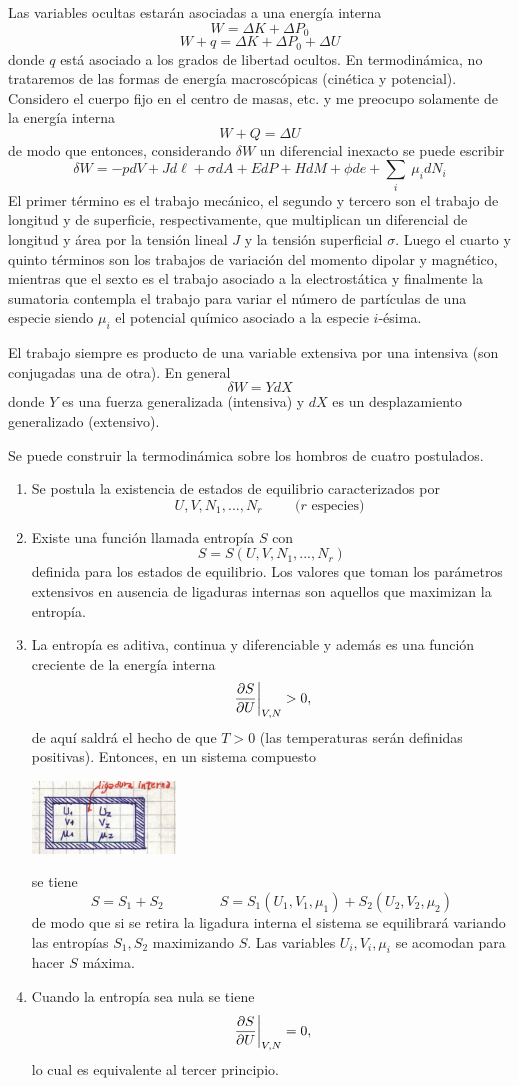 \documentclass[10pt,oneside]{CBFT_book}
\begin{document}
Las variables ocultas estarán asociadas a una energía interna
\[
	W = \Delta K + \Delta P_0
\]
\[
	W + q = \Delta K + \Delta P_0 + \Delta U
\]
donde $q$ está asociado a los grados de libertad ocultos. En termodinámica, no trataremos de las formas de 
energía macroscópicas (cinética y potencial). Considero el cuerpo fijo en el centro de masas, etc. y me
preocupo solamente de la energía interna
\[
	W + Q = \Delta U
\]
de modo que entonces, considerando $\delta W$ un diferencial inexacto se puede escribir
\[
	\delta W = - p dV + J d\ell + \sigma dA + E dP
	+ H dM + \phi de + \sum_{i} \: \mu_i dN_i
\]
El primer término es el trabajo mecánico, el segundo y tercero son el trabajo de longitud y de superficie,
respectivamente, que multiplican un diferencial de longitud y área por la tensión lineal $J$ y la tensión
superficial $\sigma$. Luego el cuarto y quinto términos son los trabajos de variación del momento dipolar
y magnético, mientras que el sexto es el trabajo asociado a la electrostática y finalmente la sumatoria
contempla el trabajo para variar el número de partículas de una especie siendo $\mu_i$ el potencial químico
asociado a la especie $i$-ésima.

El trabajo siempre es producto de una variable extensiva por una intensiva (son conjugadas una de otra).
En general
\[
	\delta W = Y dX
\]
donde $Y$ es una fuerza generalizada (intensiva) y $dX$ es un desplazamiento generalizado (extensivo).

Se puede construir la termodinámica sobre los hombros de cuatro postulados.
\begin{enumerate}
 \item Se postula la existencia de estados de equilibrio caracterizados por 
 \[
	U, V, N_1, ..., N_r \qquad \text{ ($r$ especies) }
 \]
 \item Existe una función llamada entropía $S$ con
 \[
	S = S(U, V, N_1, ..., N_r)
 \]
 definida para los estados de equilibrio. Los valores que toman los parámetros extensivos en
 ausencia de ligaduras internas son aquellos que maximizan la entropía.
 \item La entropía es aditiva, continua y diferenciable y además es una función creciente de la
 energía interna
 \[
	\left.\frac{\partial^{\hspace{-0.05em}} {S}}{\partial {U}^{\hspace{-0.05em}}}\right|_{V,N} > 0,
 \]
 de aquí saldrá el hecho de que $T > 0$ (las temperaturas serán definidas positivas).
 Entonces, en un sistema compuesto
 
\includegraphics[width=0.30\textwidth]{images/1606329014.jpg}
 
 se tiene 
 \[
	S = S_1 + S_2 \qquad \qquad S = S_1(U_1,V_1,\mu_1) + S_2(U_2,V_2,\mu_2)
 \]
 de modo que si se retira la ligadura interna el sistema se equilibrará variando las entropías $S_1,S_2$
 maximizando $S$. Las variables $U_i,V_i,\mu_i$ se acomodan para hacer $S$ máxima.
 \item Cuando la entropía sea nula se tiene
 \[
	\left.\frac{\partial^{\hspace{-0.05em}} {S}}{\partial {U}^{\hspace{-0.05em}}}\right|_{V,N} = 0,
 \]
 lo cual es equivalente al tercer principio.
\end{enumerate}
\end{document}
